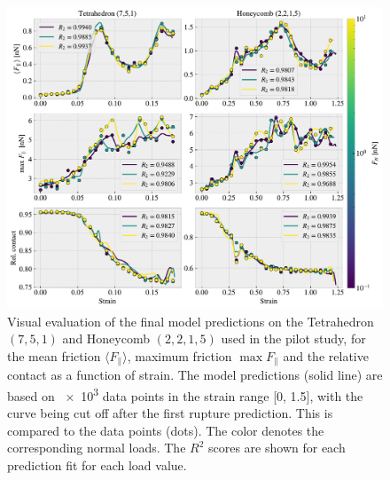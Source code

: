 \begin{figure}[H]
  \centering
  \includegraphics[width=\linewidth]{figures/ML/final_model_evaluation.pdf}
  \caption{Visual evaluation of the final model predictions on the Tetrahedron $(7,5,1)$ and Honeycomb $(2,2,1,5)$ used in the pilot study, for the mean friction $\langle F_{\parallel} \rangle$, maximum friction $\max F_\parallel$ and the relative contact as a function of strain. The model predictions (solid line) are based on \num{e3} data points in the strain range [0, 1.5], with the curve being cut off after the first rupture prediction. This is compared to the data points (dots). The color denotes the corresponding normal loads. The $R^2$ scores are shown for each prediction fit for each load value.}
  \label{fig:final_model_eval}
\end{figure}  



